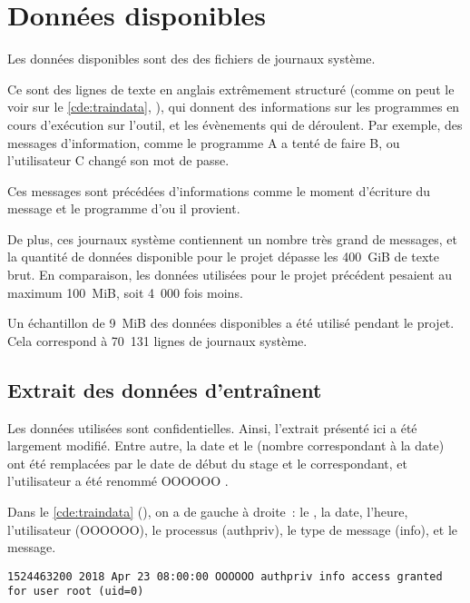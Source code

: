 \chapter{Données disponibles}\label{ch:data_papud}
Les données disponibles sont des des fichiers de journaux système.

Ce sont des lignes de texte en anglais extrêmement structuré (comme on peut le voir sur le \autoref{cde:traindata}, ),
qui donnent des informations sur les programmes en cours d'exécution sur l'outil, et les évènements qui de déroulent.
Par exemple, des messages d'information, comme \og le programme A a tenté de faire B\fg{}, ou \og l'utilisateur C changé son mot de passe\fg{}.

Ces messages sont précédées d'informations comme le moment d'écriture du message et le programme d'ou il provient.

De plus, ces journaux système contiennent un nombre très grand de messages, et la quantité de données disponible pour le projet dépasse les 400~GiB de texte brut. En comparaison, les données utilisées pour le projet précédent pesaient au maximum 100~MiB, soit 4~000 fois moins.

Un échantillon de 9~MiB des données disponibles a été utilisé pendant le projet.
Cela correspond à 70~131 lignes de journaux système.

\section{Extrait des données d'entraînent}%
Les données utilisées sont confidentielles.
Ainsi, l'extrait présenté ici a été largement modifié.
Entre autre, la date et le  (nombre correspondant à la date) ont été remplacées par le date de début du stage et le  correspondant, et l'utilisateur a été renommé \og OOOOOO \fg{}.

Dans le \autoref{cde:traindata} (), on a de gauche à droite~: le , la date, l'heure, l'utilisateur (OOOOOO), le processus (authpriv), le type de message (info), et le message.

\begin{lstlisting}[caption={[Exemple d'une ligne extraite des journaux systèmes.]Exemple d'une ligne extraite des journaux systèmes},label=cde:traindata]
	1524463200 2018 Apr 23 08:00:00 OOOOOO authpriv info access granted for user root (uid=0)
\end{lstlisting}

